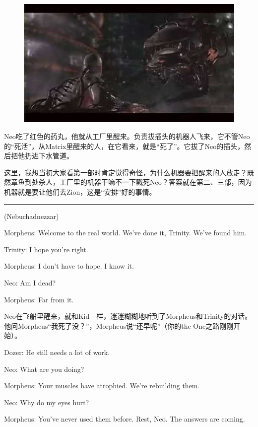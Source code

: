 \documentclass[UTF8]{ctexart}
\newcommand{\myparsep}{\noindent \rule[0.5ex]{\linewidth}{1pt}}
\newenvironment{myquote}{\color{green} \setlength{\leftskip}{6em} \setlength{\rightskip}{4em} \setlength{\parindent}{-2em}}{\par}
\begin{document}
\begin{figure}[htb]
\centering
\includegraphics[width=0.5\linewidth]{fig/read_Matrix-22-1}
\end{figure}

Neo吃了红色的药丸，他就从工厂里醒来。负责拔插头的机器人飞来，它不管Neo的“死活”，从Matrix里醒来的人，在它看来，就是“死了”。它拔了Neo的插头，然后把他扔进下水管道。

这里，我想当初大家看第一部时肯定觉得奇怪，为什么机器要把醒来的人放走？既然章鱼到处杀人，工厂里的机器干嘛不一下戳死Neo？答案就在第二、三部，因为机器就是要让他们去Zion，这是“安排”好的事情。

\myparsep

\begin{myquote}
(Nebuchadnezzar)

Morpheus: Welcome to the real world. We've done it, Trinity. We've found him.

Trinity: I hope you're right.

Morpheus: I don't have to hope. I know it.

Neo: Am I dead?

Morpheus: Far from it.
\end{myquote}

Neo在飞船里醒来，就和Kid—样，迷迷糊糊地听到了Morpheus和Trinity的对话。他问Morpheus“我死了没？”，Morpheus说“还早呢”（你的the One之路刚刚开始）。

\begin{myquote}
Dozer: He still needs a lot of work.

Neo: What are you doing?

Morpheus: Your muscles have atrophied. We're rebuilding them.

Neo: Why do my eyes hurt?

Morpheus: You've never used them before. Rest, Neo. The answers are coming.
\end{myquote}
\end{document}

